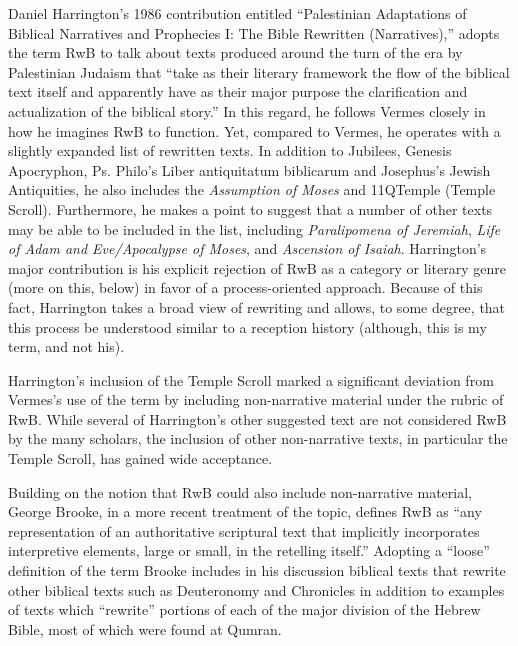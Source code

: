 Daniel Harrington's 1986 contribution entitled ``Palestinian Adaptations
of Biblical Narratives and Prophecies I: The Bible Rewritten
(Narratives),'' adopts the term RwB to talk about texts produced around
the turn of the era by Palestinian Judaism that ``take as their literary
framework the flow of the biblical text itself and apparently have as
their major purpose the clarification and actualization of the biblical
story.''\autocite[239]{harrington_kraft-nickelsburg1986} In this regard,
he follows Vermes closely in how he imagines RwB to function. Yet,
compared to Vermes, he operates with a slightly expanded list of
rewritten texts. In addition to Jubilees, Genesis Apocryphon, Ps.
Philo's Liber antiquitatum biblicarum and Josephus's Jewish Antiquities,
he also includes the \emph{Assumption of Moses} and 11QTemple
(Temple Scroll). Furthermore, he makes a point to suggest that a number
of other texts may be able to be included in the list, including
\emph{Paralipomena of Jeremiah}, \emph{Life of Adam and Eve/Apocalypse
of Moses}, and \emph{Ascension of Isaiah}. Harrington's major
contribution is his explicit rejection of RwB as a category or literary
genre (more on this, below) in favor of a process-oriented approach.
Because of this fact, Harrington takes a broad view of rewriting and
allows, to some degree, that this process be understood similar to a
reception history (although, this is my term, and not his).

Harrington's inclusion of the Temple Scroll marked a significant
deviation from Vermes's use of the term by including non-narrative
material under the rubric of RwB. While several of Harrington's other
suggested text are not considered RwB by the many scholars, the
inclusion of other non-narrative texts, in particular the Temple Scroll,
has gained wide acceptance.\autocite{bernstein_textus2005}

Building on the notion that RwB could also include non-narrative
material, George Brooke, in a more recent treatment of the topic,
defines RwB as ``any representation of an authoritative scriptural text
that implicitly incorporates interpretive elements, large or small, in
the retelling itself.''\autocite[777]{brooke_schiffman-vanderkam2000}
Adopting a ``loose'' definition of the term Brooke includes in his
discussion biblical texts that rewrite other biblical texts such as
Deuteronomy and Chronicles in addition to examples of texts which
``rewrite'' portions of each of the major division of the Hebrew Bible,
most of which were found at Qumran.\autocite[Brooke categorizes the
texts as follows: Reworked Pentateuchs, Rewritten Pentateuchal
narratives, Rewritten Pentateuchal laws, Rewritten Former Prophets,
Rewritten Latter Prophets, and Rewritten
Writings.][778--780]{brooke_schiffman-vanderkam2000}

